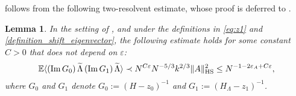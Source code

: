 \documentclass[10pt,reqno]{amsart}
\numberwithin{equation}{section}
\numberwithin{figure}{section}
\theoremstyle{plain} %
\newtheorem{lemma}[theorem]{Lemma}
\theoremstyle{definition} %
\newcommand{\wt}{\widetilde}
\renewcommand{\txt}[1]{\text{\rm{#1}}}
\newcommand{\E}{\mathbb{E}}
\renewcommand{\leq}{\le}
\newcommand{\pa}[1]{\left({#1}\right)}
\newcommand{\norm}[1]{\lVert #1 \rVert}
\newcommand{\avg}[1]{\langle #1 \rangle}
\DeclareMathOperator{\im}{\mathrm{Im}}
\newcommand{\tLambda}{{\wt{\Lambda}}}
\newcommand{\HS}{\txt{HS}}
\numberwithin{equation}{section}
\begin{document}
  follows from the following two-resolvent estimate, whose proof is deferred to .
\begin{lemma}\label{lemma_localized_eigenvector_local_law}
    In the setting of , and under the definitions in \eqref{eq:z1} and \eqref{definition_shift_eigenvector}, the following estimate holds for some constant $C>0$ that does not depend on $\varepsilon$:   \begin{equation}\label{estimate_localized_eigenvector_local_law}
        \begin{aligned}
            \E\avg{\pa{\im G_0}\tLambda\pa{\im G_1}\tLambda}\prec N^{C\varepsilon}N^{-5/3}k^{2/3}\norm{A}_{\HS}^2\leq N^{-1-2\varepsilon_A+C\varepsilon} ,
        \end{aligned}
    \end{equation}
   where $G_0$ and $G_1$ denote $G_0:=\pa{H-z_0}^{-1}$ and $G_1:=\pa{H_{\Lambda}-z_1}^{-1}$.
\end{lemma}
\end{document}
